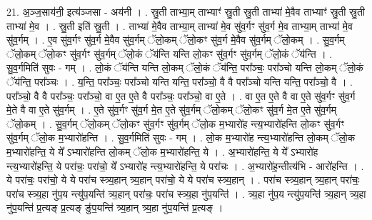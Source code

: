 \documentclass[17pt]{extarticle}
\begin{document}
21. अ॒ञ्ज॒साय॑नी॒ इत्य॑ञ्जसा - अय॑नी । . स्रु॒ती ताभ्या॒म् ताभ्याꣳ॑ स्रु॒ती स्रु॒ती ताभ्या॑ मे॒वैव ताभ्याꣳ॑ स्रु॒ती स्रु॒ती ताभ्या॑ मे॒व । . स्रु॒ती इति॑ स्रु॒ती । . ताभ्या॑ मे॒वैव ताभ्या॒म् ताभ्या॑ मे॒व सु॑व॒र्गꣳ सु॑व॒र्ग मे॒व ताभ्या॒म् ताभ्या॑ मे॒व सु॑व॒र्गम् । . ए॒व सु॑व॒र्गꣳ सु॑व॒र्ग मे॒वैव सु॑व॒र्गम् ॅलो॒कम् ॅलो॒कꣳ सु॑व॒र्ग मे॒वैव सु॑व॒र्गम् ॅलो॒कम् । . सु॒व॒र्गम् ॅलो॒कम् ॅलो॒कꣳ सु॑व॒र्गꣳ सु॑व॒र्गम् ॅलो॒कं ॅय॑न्ति यन्ति लो॒कꣳ सु॑व॒र्गꣳ सु॑व॒र्गम् ॅलो॒कं ॅय॑न्ति । . सु॒व॒र्गमिति॑ सुवः - गम् । . लो॒कं ॅय॑न्ति यन्ति लो॒कम् ॅलो॒कं ॅय॑न्ति॒ परा᳚ञ्चः॒ परा᳚ञ्चो यन्ति लो॒कम् ॅलो॒कं ॅय॑न्ति॒ परा᳚ञ्चः । . य॒न्ति॒ परा᳚ञ्चः॒ परा᳚ञ्चो यन्ति यन्ति॒ परा᳚ञ्चो॒ वै वै परा᳚ञ्चो यन्ति यन्ति॒ परा᳚ञ्चो॒ वै । . परा᳚ञ्चो॒ वै वै परा᳚ञ्चः॒ परा᳚ञ्चो॒ वा ए॒त ए॒ते वै परा᳚ञ्चः॒ परा᳚ञ्चो॒ वा ए॒ते । . वा ए॒त ए॒ते वै वा ए॒ते सु॑व॒र्गꣳ सु॑व॒र्ग मे॒ते वै वा ए॒ते सु॑व॒र्गम् । . ए॒ते सु॑व॒र्गꣳ सु॑व॒र्ग मे॒त ए॒ते सु॑व॒र्गम् ॅलो॒कम् ॅलो॒कꣳ सु॑व॒र्ग मे॒त ए॒ते सु॑व॒र्गम् ॅलो॒कम् । . सु॒व॒र्गम् ॅलो॒कम् ॅलो॒कꣳ सु॑व॒र्गꣳ सु॑व॒र्गम् ॅलो॒क म॒भ्यारो॑ह न्त्य॒भ्यारो॑हन्ति लो॒कꣳ सु॑व॒र्गꣳ सु॑व॒र्गम् ॅलो॒क म॒भ्यारो॑हन्ति । . सु॒व॒र्गमिति॑ सुवः - गम् । . लो॒क म॒भ्यारो॑ह न्त्य॒भ्यारो॑हन्ति लो॒कम् ॅलो॒क म॒भ्यारो॑हन्ति॒ ये ये᳚ ऽभ्यारो॑हन्ति लो॒कम् ॅलो॒क म॒भ्यारो॑हन्ति॒ ये । . अ॒भ्यारो॑हन्ति॒ ये ये᳚ ऽभ्यारो॑ह न्त्य॒भ्यारो॑हन्ति॒ ये परा॑चः॒ परा॑चो॒ ये᳚ ऽभ्यारो॑ह न्त्य॒भ्यारो॑हन्ति॒ ये परा॑चः । . अ॒भ्यारो॑ह॒न्तीत्य॑भि - आरो॑हन्ति । . ये परा॑चः॒ परा॑चो॒ ये ये परा॑च स्त्र्य॒हान् त्र्य॒हान् परा॑चो॒ ये ये परा॑च स्त्र्य॒हान् । . परा॑च स्त्र्य॒हान् त्र्य॒हान् परा॑चः॒ परा॑च स्त्र्य॒हा नु॑प॒य न्त्यु॑प॒यन्ति॑ त्र्य॒हान् परा॑चः॒ परा॑च स्त्र्य॒हा नु॑प॒यन्ति॑ । . त्र्य॒हा नु॑प॒य न्त्यु॑प॒यन्ति॑ त्र्य॒हान् त्र्य॒हा नु॑प॒यन्ति॑ प्र॒त्यङ् प्र॒त्यङ् ङु॑प॒यन्ति॑ त्र्य॒हान् त्र्य॒हा नु॑प॒यन्ति॑ प्र॒त्यङ् । \newline
\end{document}
